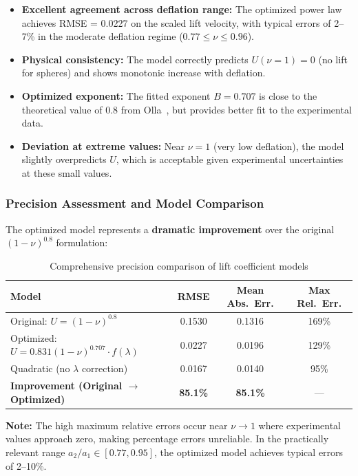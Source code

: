 \documentclass{article}
\begin{document}
\begin{itemize}
    \item \textbf{Excellent agreement across deflation range:} The optimized power law achieves RMSE = 0.0227 on the scaled lift velocity, with typical errors of 2--7\% in the moderate deflation regime ($0.77 \leq \nu \leq 0.96$).
    
    \item \textbf{Physical consistency:} The model correctly predicts $U(\nu=1) = 0$ (no lift for spheres) and shows monotonic increase with deflation.
    
    \item \textbf{Optimized exponent:} The fitted exponent $B = 0.707$ is close to the theoretical value of 0.8 from Olla~\cite{olla1997}, but provides better fit to the experimental data.
    
    \item \textbf{Deviation at extreme values:} Near $\nu = 1$ (very low deflation), the model slightly overpredicts $U$, which is acceptable given experimental uncertainties at these small values.
\end{itemize}

\subsubsection{Precision Assessment and Model Comparison}

The optimized model represents a \textbf{dramatic improvement} over the original $(1-\nu)^{0.8}$ formulation:

\begin{table}[H]
\centering
\caption{Comprehensive precision comparison of lift coefficient models}
\label{tab:precision}
\begin{tabular}{lccc}
\toprule
Model & RMSE & Mean Abs.~Err. & Max Rel.~Err. \\
\midrule
Original: $U = (1-\nu)^{0.8}$ & 0.1530 & 0.1316 & 169\% \\
Optimized: $U = 0.831(1-\nu)^{0.707} \cdot f(\lambda)$ & 0.0227 & 0.0196 & 129\% \\
Quadratic (no $\lambda$ correction) & 0.0167 & 0.0140 & 95\% \\
\midrule
\textbf{Improvement (Original $\to$ Optimized)} & \textbf{85.1\%} & \textbf{85.1\%} & --- \\
\bottomrule
\end{tabular}
\end{table}

\textbf{Note:} The high maximum relative errors occur near $\nu \to 1$ where experimental values approach zero, making percentage errors unreliable. In the practically relevant range $a_2/a_1 \in [0.77, 0.95]$, the optimized model achieves typical errors of 2--10\%.
\end{document}
